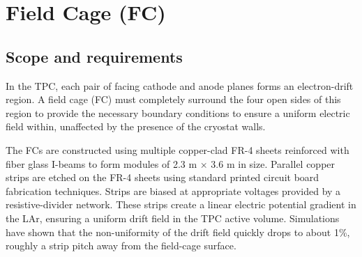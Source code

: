 



\section{Field Cage (FC)}
\label{detcompsec-fc}
\subsection{Scope and requirements} 

In the TPC, each pair of facing cathode and anode planes forms an electron-drift region. A field
cage (FC) must completely surround the four open sides of this region to provide the necessary boundary
conditions to ensure a uniform electric field within, unaffected by the presence of the cryostat walls.

The FCs are constructed using multiple copper-clad FR-4 sheets reinforced with fiber
glass I-beams to form modules of 2.3 m $\times$ 3.6 m in size. Parallel copper strips are etched on
the FR-4 sheets using standard printed circuit board fabrication techniques. Strips are biased at
appropriate voltages provided by a resistive-divider network. These strips create a linear electric potential
gradient in the LAr, ensuring a uniform drift field in the TPC active volume. Simulations
have shown that the non-uniformity of the drift field quickly drops to about 1\%, roughly a strip
pitch away from the field-cage surface.

